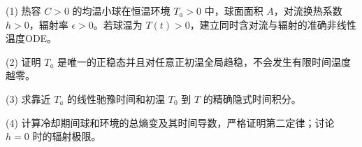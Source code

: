(1) 热容 \(C>0\) 的均温小球在恒温环境 \(T_a>0\) 中，球面面积 \(A\)，对流换热系数 \(h>0\)，辐射率 \(\epsilon>0\)。若球温为 \(T(t)>0\)，建立同时含对流与辐射的准确非线性温度ODE。

(2) 证明 \(T_a\) 是唯一的正稳态并且对任意正初温全局趋稳，不会发生有限时间温度越零。

(3) 求靠近 \(T_a\) 的线性驰豫时间和初温 \(T_0\) 到 \(T\) 的精确隐式时间积分。

(4) 计算冷却期间球和环境的总熵变及其时间导数，严格证明第二定律；讨论 \(h=0\) 时的辐射极限。
